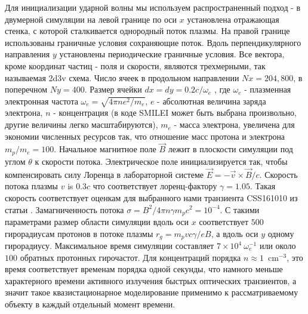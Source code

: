 Для инициализации ударной волны мы используем распространенный подход - в двумерной симуляции на левой границе по оси $x$ установлена отражающая стенка, с которой сталкивается однородный поток плазмы. На правой границе использованы граничные условия сохраняющие поток. Вдоль перпендикулярного направления $y$ установлены периодические граничные условия. Все вектора, кроме координат частиц - поля и скорости, являются трехмерными, так называемая 2d3v схема. Число ячеек в продольном направлении 
$\displaystyle Nx = 204,800$, в поперечном $\displaystyle Ny = 400$. Размер ячейки $dx = dy = 0.2c/{\omega_e}$ , где $\displaystyle\omega_e$ - плазменная электронная частота $\displaystyle\omega_e = \sqrt{4 \pi n e^2/ m_e}$, $\displaystyle e$ - абсолютная величина заряда электрона, $\displaystyle n$ - концентрация (в коде SMILEI может быть выбрана произвольно, другие величины легко масштабируются), $\displaystyle m_e$ - масса электрона, увеличена для экономии численных ресурсов так, что отношение масс протона и электрона $m_p/m_e = 100$. Начальное магнитное поле $\displaystyle\vec{B}$ лежит в плоскости симуляции под углом $\displaystyle\theta$ к скорости потока. Электрическое поле инициализируется так, чтобы компенсировать силу Лоренца в лабораторной системе $\displaystyle\vec{E} = -\vec{v} \times
\vec{B}/c$. Скорость потока плазмы $\displaystyle v$  is $0.3 c$ 
что соответствует лоренц-фактору $\displaystyle\gamma = 1.05$. Такая скорость соответствует оценкам для выбранного нами транзиента CSS161010 из статьи \cite{Coppejans2020}. Замагниченность потока $\displaystyle\sigma = B^2/4 \pi n \gamma m_p c^2 = 10^{-4}$. С такими параметрами размер области симуляции вдоль оси $\displaystyle x$ соответствует $\displaystyle 500$
гирорадиусам протонов в потоке плазмы $\displaystyle r_g = m_p v c \gamma/e B$, а вдоль оси $\displaystyle y$ одному гирорадиусу. Максимальное время симуляции составляет $\displaystyle 7\times 10^4~\omega_{e}^{-1}$ или около
$\displaystyle 100$ обратных протонных гирочастот. Для концентраций порядка $\displaystyle n\approx
1$~cm$^{-3}$, это время соответствует временам порядка одной секунды, что намного меньше характерного времени активного излучения быстрых оптических транзиентов, а значит такое квазистационарное моделирование применимо к рассматриваемому объекту в каждый отдельный момент времени.

